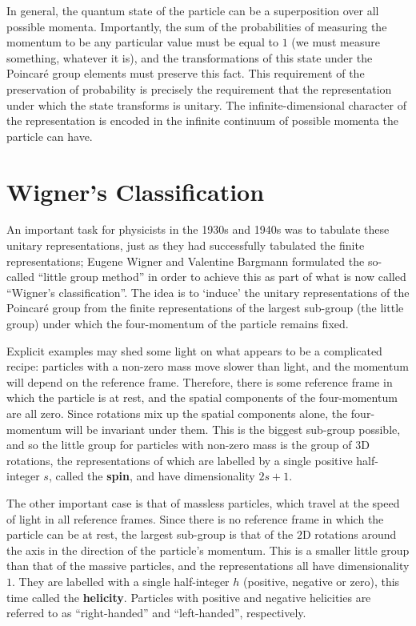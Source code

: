 \documentclass[12pt]{article}
\begin{document}
In general, the quantum state of the particle can be a superposition over all possible momenta. Importantly, the sum of the probabilities of measuring the momentum to be any particular value must be equal to $1$ (we must measure something, whatever it is), and the transformations of this state under the Poincaré group elements must preserve this fact. This requirement of the preservation of probability is precisely the requirement that the representation under which the state transforms is unitary. The infinite-dimensional character of the representation is encoded in the infinite continuum of possible momenta the particle can have.

\section{Wigner's Classification}

An important task for physicists in the 1930s and 1940s was to tabulate these unitary representations, just as they had successfully tabulated the finite representations; Eugene Wigner and Valentine Bargmann formulated the so-called ``little group method'' in order to achieve this as part of what is now called ``Wigner's classification''. The idea is to `induce' the unitary representations of the Poincaré group from the finite representations of the largest sub-group (the little group) under which the four-momentum of the particle remains fixed.
\newline

Explicit examples may shed some light on what appears to be a complicated recipe: particles with a non-zero mass move slower than light, and the momentum will depend on the reference frame. Therefore, there is some reference frame in which the particle is at rest, and the spatial components of the four-momentum are all zero. Since rotations mix up the spatial components alone, the four-momentum will be invariant under them. This is the biggest sub-group possible, and so the little group for particles with non-zero mass is the group of $3$D rotations, the representations of which are labelled by a single positive half-integer $s$, called the \textbf{spin}, and have dimensionality $2s+1$.
\newline

The other important case is that of massless particles, which travel at the speed of light in all reference frames. Since there is no reference frame in which the particle can be at rest, the largest sub-group is that of the $2$D rotations around the axis in the direction of the particle's momentum. This is a smaller little group than that of the massive particles, and the representations all have dimensionality $1$. They are labelled with a single half-integer $h$ (positive, negative or zero), this time called the \textbf{helicity}. Particles with positive and negative helicities are referred to as ``right-handed'' and ``left-handed'', respectively.
\newline
\end{document}
